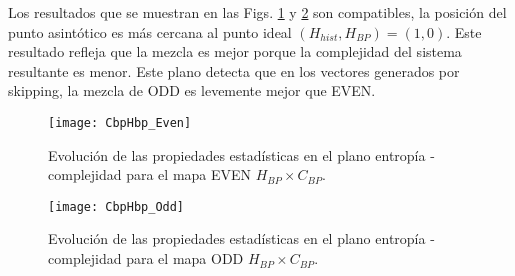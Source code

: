 Los resultados que se muestran en las Figs. \ref{fig:EVEN_HC} y \ref{fig:ODD_HC} son compatibles, la posición del punto asintótico es más cercana al punto ideal $(H_{hist}, H_{BP}) = (1, 0)$.
Este resultado refleja que la mezcla es mejor porque la complejidad del sistema resultante es menor.
Este plano detecta que en los vectores generados por skipping, la mezcla de ODD es levemente mejor que EVEN.
%
\begin{figure}[htpb]
	\centering
	\texttt{[image: CbpHbp\_Even]}
	\caption{Evolución de las propiedades estadísticas en el plano entropía - complejidad para el mapa EVEN $H_{BP} \times C_{BP}$.}
	\label{fig:EVEN_HC}
\end{figure}

\begin{figure}[htpb]
	\centering
	\texttt{[image: CbpHbp\_Odd]}
	\caption{Evolución de las propiedades estadísticas en el plano entropía - complejidad para el mapa ODD $H_{BP} \times C_{BP}$.}
	\label{fig:ODD_HC}
\end{figure}